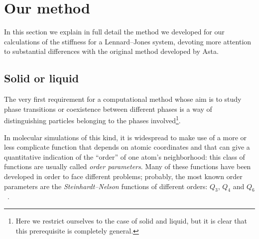 \section{Our method\label{sec:method}}
In this section we explain in full detail the method we developed for our calculations of the stiffness for a Lennard--Jones system,  devoting more attention to substantial differences with the original method developed by Asta.

\subsection{Solid or liquid}
The very first requirement for a computational method whose aim is to study phase transitions or coexistence between different phases is a way of distinguishing particles belonging to the phases involved\footnote{Here we restrict ourselves to the case of solid and liquid, but it is clear that this prerequisite is completely general.}.

In molecular simulations of this kind, it is widespread to make use of a more or less complicate function that depends on atomic coordinates and that can give a quantitative indication of the ``order'' of one atom's neighborhood: this class of functions are usually called \emph{order parameters}. Many of these functions have been developed in order to face different problems; probably, the most known order parameters are the \textit{Steinhardt--Nelson} functions of different orders: $Q_3$, $Q_4$ and $Q_6$~\cite{Steinhardt1983}.

